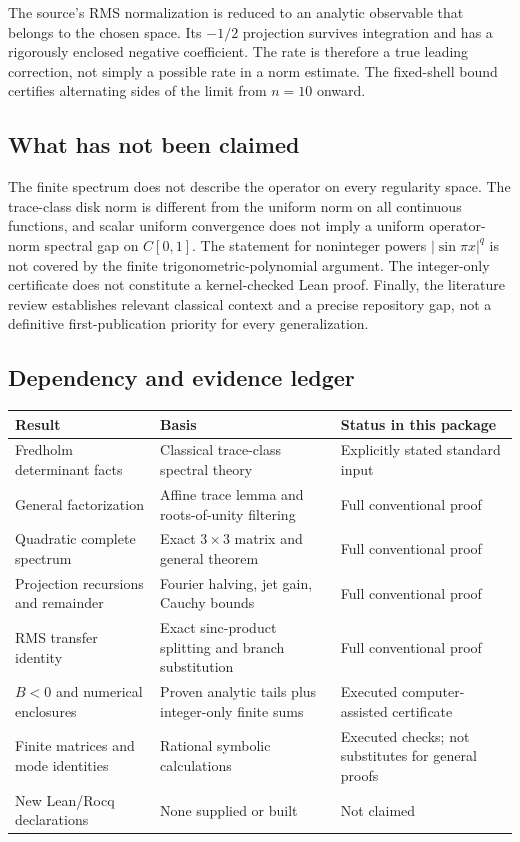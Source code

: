 \documentclass[11pt,a4paper]{article}
\theoremstyle{definition}
\theoremstyle{remark}
\numberwithin{equation}{section}
\begin{document}
The source's RMS normalization is reduced to an analytic observable that
belongs to the chosen space. Its $-1/2$ projection survives integration and
has a rigorously enclosed negative coefficient. The rate is therefore a
true leading correction, not simply a possible rate in a norm estimate.
The fixed-shell bound certifies alternating sides of the limit from
$n=10$ onward.

\subsection{What has not been claimed}
The finite spectrum does not describe the operator on every regularity
space. The trace-class disk norm is different from the uniform norm on all
continuous functions, and scalar uniform convergence does not imply a
uniform operator-norm spectral gap on $C[0,1]$. The statement for noninteger
powers $|\sin\pi x|^q$ is not covered by the finite trigonometric-polynomial
argument. The integer-only certificate does not constitute a kernel-checked
Lean proof. Finally, the literature review establishes relevant classical
context and a precise repository gap, not a definitive first-publication
priority for every generalization.

\subsection{Dependency and evidence ledger}
\begin{center}
\small
\begin{tabularx}{\textwidth}{@{}>{\raggedright\arraybackslash}p{}>{\raggedright\arraybackslash}X>{\raggedright\arraybackslash}p{}@{}}
\toprule
Result & Basis & Status in this package\\
\midrule
Fredholm determinant facts & Classical trace-class spectral theory
\cite{simon,bornemann} & Explicitly stated standard input\\
General factorization & Affine trace lemma and roots-of-unity filtering
& Full conventional proof\\
Quadratic complete spectrum & Exact $3\times3$ matrix and general theorem
& Full conventional proof\\
Projection recursions and remainder & Fourier halving, jet gain, Cauchy bounds
& Full conventional proof\\
RMS transfer identity & Exact sinc-product splitting and branch substitution
& Full conventional proof\\
$B<0$ and numerical enclosures & Proven analytic tails plus integer-only finite sums
& Executed computer-assisted certificate\\
Finite matrices and mode identities & Rational symbolic calculations
& Executed checks; not substitutes for general proofs\\
New Lean/Rocq declarations & None supplied or built
& Not claimed\\
\bottomrule
\end{tabularx}
\end{center}
\end{document}
